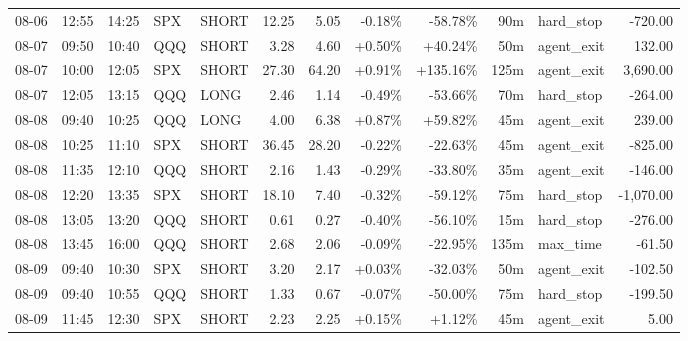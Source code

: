 \documentclass[11pt,a4paper,twoside]{article}
\begin{document}
\begin{center}
\begin{longtable}{>{\color{txtmain}}l l l l l r r r r r >{\color{txtmain}}l r}
08-06 & 12:55 & 14:25 & SPX & SHORT & 12.25 & 5.05 & \textcolor{lossred}{-0.18\%} & \textcolor{lossred}{-58.78\%} & 90m & hard\_stop & \textcolor{lossred}{-720.00} \\
08-07 & 09:50 & 10:40 & QQQ & SHORT & 3.28 & 4.60 & \textcolor{wingreen}{+0.50\%} & \textcolor{wingreen}{+40.24\%} & 50m & agent\_exit & \textcolor{wingreen}{132.00} \\
08-07 & 10:00 & 12:05 & SPX & SHORT & 27.30 & 64.20 & \textcolor{wingreen}{+0.91\%} & \textcolor{wingreen}{+135.16\%} & 125m & agent\_exit & \textcolor{wingreen}{3,690.00} \\
08-07 & 12:05 & 13:15 & QQQ & LONG & 2.46 & 1.14 & \textcolor{lossred}{-0.49\%} & \textcolor{lossred}{-53.66\%} & 70m & hard\_stop & \textcolor{lossred}{-264.00} \\
08-08 & 09:40 & 10:25 & QQQ & LONG & 4.00 & 6.38 & \textcolor{wingreen}{+0.87\%} & \textcolor{wingreen}{+59.82\%} & 45m & agent\_exit & \textcolor{wingreen}{239.00} \\
08-08 & 10:25 & 11:10 & SPX & SHORT & 36.45 & 28.20 & \textcolor{lossred}{-0.22\%} & \textcolor{lossred}{-22.63\%} & 45m & agent\_exit & \textcolor{lossred}{-825.00} \\
08-08 & 11:35 & 12:10 & QQQ & SHORT & 2.16 & 1.43 & \textcolor{lossred}{-0.29\%} & \textcolor{lossred}{-33.80\%} & 35m & agent\_exit & \textcolor{lossred}{-146.00} \\
08-08 & 12:20 & 13:35 & SPX & SHORT & 18.10 & 7.40 & \textcolor{lossred}{-0.32\%} & \textcolor{lossred}{-59.12\%} & 75m & hard\_stop & \textcolor{lossred}{-1,070.00} \\
08-08 & 13:05 & 13:20 & QQQ & SHORT & 0.61 & 0.27 & \textcolor{lossred}{-0.40\%} & \textcolor{lossred}{-56.10\%} & 15m & hard\_stop & \textcolor{lossred}{-276.00} \\
08-08 & 13:45 & 16:00 & QQQ & SHORT & 2.68 & 2.06 & \textcolor{lossred}{-0.09\%} & \textcolor{lossred}{-22.95\%} & 135m & max\_time & \textcolor{lossred}{-61.50} \\
08-09 & 09:40 & 10:30 & SPX & SHORT & 3.20 & 2.17 & \textcolor{wingreen}{+0.03\%} & \textcolor{lossred}{-32.03\%} & 50m & agent\_exit & \textcolor{lossred}{-102.50} \\
08-09 & 09:40 & 10:55 & QQQ & SHORT & 1.33 & 0.67 & \textcolor{lossred}{-0.07\%} & \textcolor{lossred}{-50.00\%} & 75m & hard\_stop & \textcolor{lossred}{-199.50} \\
08-09 & 11:45 & 12:30 & SPX & SHORT & 2.23 & 2.25 & \textcolor{wingreen}{+0.15\%} & \textcolor{wingreen}{+1.12\%} & 45m & agent\_exit & \textcolor{wingreen}{5.00} \\

\end{longtable}
\end{center}
\end{document}
